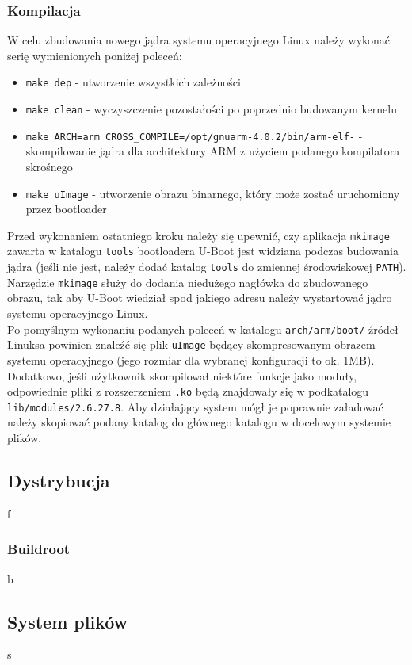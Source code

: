 \documentclass[a4paper,12pt]{book}
\begin{document}
				\subsubsection{Kompilacja}
					W celu zbudowania nowego jądra systemu operacyjnego Linux należy wykonać serię wymienionych poniżej poleceń:
					\begin{itemize}
						\item \texttt{make dep} - utworzenie wszystkich zależności
						\item \texttt{make clean} - wyczyszczenie pozostałości po poprzednio budowanym kernelu
						\item \texttt{make ARCH=arm CROSS\_COMPILE=/opt/gnuarm-4.0.2/bin/arm-elf-} - skompilowanie jądra dla architektury ARM z użyciem podanego kompilatora skrośnego
						\item \texttt{make uImage} - utworzenie obrazu binarnego, który może zostać uruchomiony przez bootloader
					\end{itemize}
					Przed wykonaniem ostatniego kroku należy się upewnić, czy aplikacja \texttt{mkimage} zawarta w katalogu \texttt{tools} bootloadera U-Boot jest widziana podczas budowania jądra (jeśli nie jest, należy dodać katalog \texttt{tools} do zmiennej środowiskowej \texttt{PATH}). Narzędzie \texttt{mkimage} służy do dodania niedużego nagłówka do zbudowanego obrazu, tak aby U-Boot wiedział spod jakiego adresu należy wystartować jądro systemu operacyjnego Linux.\\
					Po pomyślnym wykonaniu podanych poleceń w katalogu \texttt{arch/arm/boot/} źródeł Linuksa powinien znaleźć się plik \texttt{uImage} będący skompresowanym obrazem systemu operacyjnego (jego rozmiar dla wybranej konfiguracji to ok. 1MB). Dodatkowo, jeśli użytkownik skompilował niektóre funkcje jako moduły, odpowiednie pliki z rozszerzeniem \texttt{.ko} będą znajdowały się w podkatalogu \texttt{lib/modules/2.6.27.8}. Aby działający system mógł je poprawnie załadować należy skopiować podany katalog do głównego katalogu w docelowym systemie plików. 
			\subsection{Dystrybucja}
				f
				\subsubsection{Buildroot}
					b
			\subsection{System plików}
				\label{sec:filesystem}
				s
\end{document}
